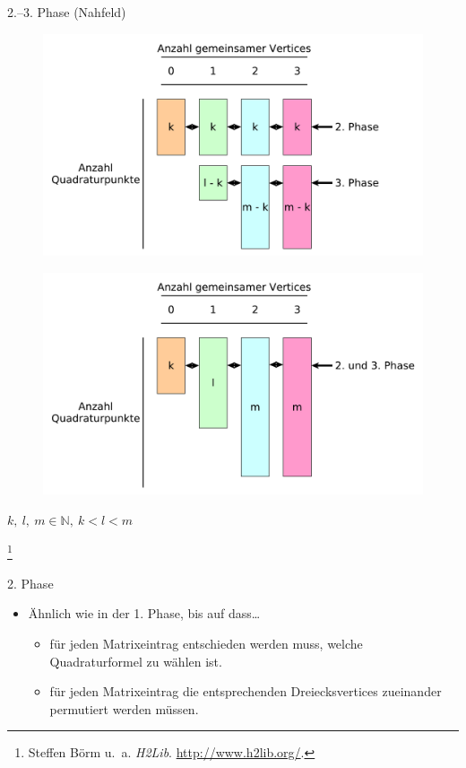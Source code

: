 \documentclass[10pt]{beamer}
\let\svthefootnote\thefootnote
\begin{document}
\begin{frame}{2.--3. Phase (Nahfeld)}
  \begin{overprint}
      \begin{figure}
        \centering
        \includegraphics[width=.9\linewidth]{figures/fg-nf-quad-points-div.pdf}
      \end{figure}
      \begin{figure}
        \centering
        \includegraphics[width=.9\linewidth]{figures/fg-nf-quad-points.pdf}
      \end{figure}
  \end{overprint}

  \centerline{\( k, \ l, \ m \in \mathbb{N}, \ k < l < m\)}

  \footnotesize
  \let\thefootnote\relax\footnote{Steffen Börm u.\ a. \textit{H2Lib}.
  \url{http://www.h2lib.org/}.}
  \addtocounter{footnote}{-1}\let\thefootnote\svthefootnote\relax
  \normalsize
\end{frame}

\begin{frame}{2. Phase}
  \begin{itemize}
    \item \"Ahnlich wie in der 1. Phase, bis auf dass\ldots
    \begin{itemize}
      \item f\"ur jeden Matrixeintrag entschieden werden muss, welche
            Quadraturformel zu wählen ist.
      \item f\"ur jeden Matrixeintrag die entsprechenden Dreiecksvertices
            zueinander permutiert werden müssen.
    \end{itemize}
  \end{itemize}
\end{frame}
\end{document}
